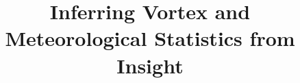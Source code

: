 \documentclass{aastex63}
\begin{document}
\title{Inferring Vortex and Meteorological Statistics from Insight}


\end{document}
